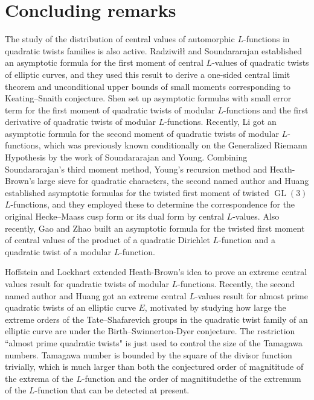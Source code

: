 \documentclass[12pt,reqno]{amsart}
\numberwithin{equation}{section}
\theoremstyle{plain}
\theoremstyle{definition}
\theoremstyle{remark}
\newcommand{\GL}{\operatorname{GL}}
\begin{document}
\section{Concluding remarks}\label{remarks}

The study of the distribution of central values of automorphic $L$-functions in quadratic twists families is also active.
Radziwi{\l \l} and Soundararajan\cite{RS15} established an asymptotic formula for the first moment of central $L$-values
of quadratic twists of elliptic curves, and they used this result to derive a one-sided central limit theorem and unconditional upper bounds of small moments corresponding to Keating--Snaith conjecture\cite{KS00b}.
Shen\cite{Sh22} set up asymptotic formulas with small error term for the first moment of quadratic twists of modular $L$-functions and the first derivative of quadratic twists of modular $L$-functions.
Recently, Li\cite{Li22} got an asymptotic formula for the second moment of quadratic twists of modular $L$-functions, which was previously known conditionally on the Generalized Riemann Hypothesis by the work of Soundararajan and Young\cite{SY10}.
Combining Soundararajan's third moment method\cite{So00}, Young's recursion method\cite{Yo09} and Heath-Brown's large sieve for quadratic characters\cite{HB95}, the second named author and Huang\cite{HH22a} established asymptotic formulas for the twisted first moment of twisted $\GL(3)$ $L$-functions, and they employed these to determine the correspondence for the original Hecke--Maass cusp form or its dual form by central $L$-values.
Also recently, Gao and Zhao\cite{GZ23} built an asymptotic formula for the twisted first moment of central values of the product of a quadratic Dirichlet $L$-function and a quadratic twist of a modular $L$-function.

Hoffstein and Lockhart\cite{HL99} extended Heath-Brown's idea to prove an extreme central values result for quadratic twists of modular $L$-functions.
Recently, the second named author and Huang\cite{HH22c} got an extreme central $L$-values result for almost prime quadratic twists of an elliptic curve $E$, motivated by studying how large the extreme orders of the Tate--Shafarevich groups in the quadratic twist family of an elliptic curve are under the Birth--Swinnerton-Dyer conjecture. The restriction ``almost prime quadratic twists" is just used to control the size of the Tamagawa numbers.
Tamagawa number is bounded by the square of the divisor function trivially, which is much larger than both the conjectured order of magnititude of the extrema of the $L$-function and the order of magnititudethe of the extremum of the $L$-function that can be detected at present.
\end{document}
